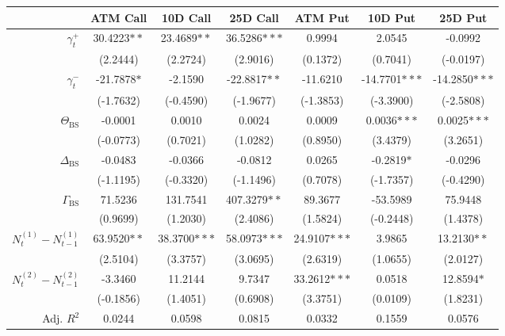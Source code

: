 \begin{tabular}{rSSSSSS}
\toprule
{} & {ATM Call} & {10D Call} & {25D Call} & {ATM Put} &  {10D Put} &  {25D Put} \\
\midrule
$\gamma^+_t$         &    30.4223$**$ &    23.4689$**$ &   36.5286$***$ &        0.9994 &         2.0545 &        -0.0992 \\
            &       (2.2444) &       (2.2724) &       (2.9016) &      (0.1372) &       (0.7041) &      (-0.0197) \\
$\gamma^-_t$         &    -21.7878$*$ &        -2.1590 &   -22.8817$**$ &      -11.6210 &  -14.7701$***$ &  -14.2850$***$ \\
            &      (-1.7632) &      (-0.4590) &      (-1.9677) &     (-1.3853) &      (-3.3900) &      (-2.5808) \\
$\Theta_\text{BS}$     &        -0.0001 &         0.0010 &         0.0024 &        0.0009 &    0.0036$***$ &    0.0025$***$ \\
            &      (-0.0773) &       (0.7021) &       (1.0282) &      (0.8950) &       (3.4379) &       (3.2651) \\
$\Delta_\text{BS}$     &        -0.0483 &        -0.0366 &        -0.0812 &        0.0265 &     -0.2819$*$ &        -0.0296 \\
            &      (-1.1195) &      (-0.3320) &      (-1.1496) &      (0.7078) &      (-1.7357) &      (-0.4290) \\
$\Gamma_\text{BS}$   &        71.5236 &       131.7541 &   407.3279$**$ &       89.3677 &       -53.5989 &        75.9448 \\
            &       (0.9699) &       (1.2030) &       (2.4086) &      (1.5824) &      (-0.2448) &       (1.4378) \\
$N^{(1)}_t - N^{(1)}_{t-1}$ &    63.9520$**$ &   38.3700$***$ &   58.0973$***$ &  24.9107$***$ &         3.9865 &    13.2130$**$ \\
            &       (2.5104) &       (3.3757) &       (3.0695) &      (2.6319) &       (1.0655) &       (2.0127) \\
$N^{(2)}_t - N^{(2)}_{t-1}$ &        -3.3460 &        11.2144 &         9.7347 &  33.2612$***$ &         0.0518 &     12.8594$*$ \\
            &      (-0.1856) &       (1.4051) &       (0.6908) &      (3.3751) &       (0.0109) &       (1.8231) \\
\midrule
Adj. $R^2$ & 0.0244 & 0.0598 & 0.0815 & 0.0332 & 0.1559 & 0.0576\\\bottomrule
\end{tabular}
